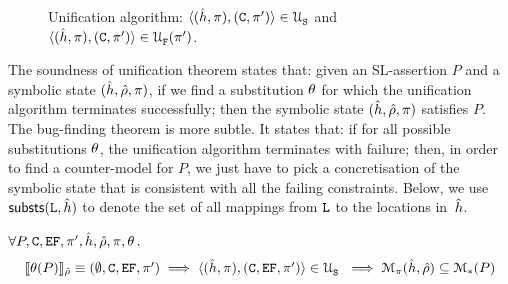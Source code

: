 \begin{figure}[t!]
{\scriptsize
\centering
{}}
\vspace*{-0.6cm}
\caption{Unification algorithm: {\small $\langle (\hat{h}, \pi), (\mathtt{C}, \pi') \rangle \in {\cal U}_{\mathtt{S}}^{}$}
and {\small $\langle (\hat{h}, \pi), (\mathtt{C}, \pi') \rangle \in {\cal U}_{\mathtt{F}}^{}(\pi')$}.\label{unification:algorithm}}
\vspace*{-0.3cm}
\end{figure}

The soundness of unification theorem states that: given an SL-assertion $P$ and a 
symbolic state $(\hat{h}, \hat\rho, \pi)$, if we find a substitution $\theta$ 
for which the unification algorithm terminates successfully; then the symbolic state
$(\hat{h}, \hat\rho, \pi)$ satisfies $P$. 
The bug-finding theorem is more subtle. It states that: if for all possible substitutions 
$\theta$, the unification algorithm terminates with failure; then, in order to find a counter-model 
for $P$, we just have to pick a concretisation of the symbolic state that is consistent with all 
the failing constraints. Below, we use ${\sf substs}(\mathtt{L}, \hat{h})$ to denote 
the set of all mappings from $\mathtt{L}$ to the locations in~$\hat{h}$. 

\begin{theorem}\label{teo:unification:soundness}
$\forall P, \mathtt{C}, \mathtt{EF}, \pi',  \hat{h}, \hat\rho, \pi, \theta \, .$
$$
\begin{array}{l}
\llbracket \theta(P) \rrbracket_{\hat\rho} \equiv (\emptyset, \mathtt{C}, \mathtt{EF}, \pi')\implies\langle (\hat{h}, \pi), (\mathtt{C}, \mathtt{EF}, \pi') \rangle \in {\cal U}_{\mathtt{S}}^{} \
    \implies \mathcal{M}_{\pi}(\hat{h}, \hat\rho) \subseteq \mathcal{M}_{*}(P)   
\end{array}
$$ 
\end{theorem}

